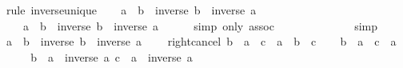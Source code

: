 \begin{isabellebody}
%
\isadelimproof
%
\endisadelimproof
%
\isatagproof
{}\isamarkupfalse%
\ {\isacharparenleft}{\kern0pt}rule\ inverse{\isacharunderscore}{\kern0pt}unique{\isacharparenright}{\kern0pt}\isanewline
\ \ \isamarkupfalse%
\ {\isachardoublequoteopen}a\ \isactrlbold {\isacharasterisk}{\kern0pt}\ b\ \isactrlbold {\isacharasterisk}{\kern0pt}\ {\isacharparenleft}{\kern0pt}inverse\ b\ \isactrlbold {\isacharasterisk}{\kern0pt}\ inverse\ a{\isacharparenright}{\kern0pt}\ {\isacharequal}{\kern0pt}\isanewline
\ \ \ \ a\ \isactrlbold {\isacharasterisk}{\kern0pt}\ {\isacharparenleft}{\kern0pt}b\ \isactrlbold {\isacharasterisk}{\kern0pt}\ inverse\ b{\isacharparenright}{\kern0pt}\ \isactrlbold {\isacharasterisk}{\kern0pt}\ inverse\ a{\isachardoublequoteclose}\isanewline
\ \ \ \ \isamarkupfalse%
\ {\isacharparenleft}{\kern0pt}simp\ only{\isacharcolon}{\kern0pt}\ assoc{\isacharparenright}{\kern0pt}\isanewline
\ \ \isamarkupfalse%
\ \isamarkupfalse%
\ {\isachardoublequoteopen}{\isasymdots}\ {\isacharequal}{\kern0pt}\ \isanewline
\ \ \ \ \isamarkupfalse%
\ simp\isanewline
\ \ \isamarkupfalse%
\ \isamarkupfalse%
\ {\isachardoublequoteopen}a\ \isactrlbold {\isacharasterisk}{\kern0pt}\ b\ \isactrlbold {\isacharasterisk}{\kern0pt}\ {\isacharparenleft}{\kern0pt}inverse\ b\ \isactrlbold {\isacharasterisk}{\kern0pt}\ inverse\ a{\isacharparenright}{\kern0pt}\ {\isacharequal}{\kern0pt}\ \ \isacommand{{\isachardot}{\kern0pt}}\isamarkupfalse%
\isanewline
{}\isamarkupfalse%
%
\endisatagproof
{\isafoldproof}%
%
\isadelimproof
\isanewline
%
\endisadelimproof
\isanewline
{}\isamarkupfalse%
\ right{\isacharunderscore}{\kern0pt}cancel{\isacharcolon}{\kern0pt}\ {\isachardoublequoteopen}b\ \isactrlbold {\isacharasterisk}{\kern0pt}\ a\ {\isacharequal}{\kern0pt}\ c\ \isactrlbold {\isacharasterisk}{\kern0pt}\ a\ {\isasymlongleftrightarrow}\ b\ {\isacharequal}{\kern0pt}\ c{\isachardoublequoteclose}\isanewline
%
\isadelimproof
%
\endisadelimproof
%
\isatagproof
{}\isamarkupfalse%
\isanewline
\ \ \isamarkupfalse%
\ {\isachardoublequoteopen}b\ \isactrlbold {\isacharasterisk}{\kern0pt}\ a\ {\isacharequal}{\kern0pt}\ c\ \isactrlbold {\isacharasterisk}{\kern0pt}\ a{\isachardoublequoteclose}\isanewline
\ \ \isamarkupfalse%
\ \isamarkupfalse%
\ {\isachardoublequoteopen}b\ \isactrlbold {\isacharasterisk}{\kern0pt}\ a\ \isactrlbold {\isacharasterisk}{\kern0pt}\ inverse\ a{\isacharequal}{\kern0pt}\ c\ \isactrlbold {\isacharasterisk}{\kern0pt}\ a\ \isactrlbold {\isacharasterisk}{\kern0pt}\ inverse\ a{\isachardoublequoteclose}\isanewline

\end{isabellebody}
